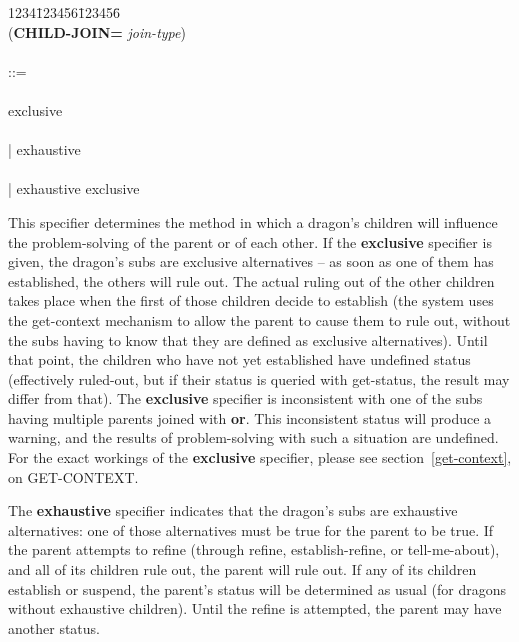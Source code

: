 \begin{tabbing}
1234\=123456\=123456\= \kill
\\
({\bf CHILD-JOIN=}  {\it join-type\/}) \\
\\
 ::= \\
\\
\>\>\>exclusive \\
\\
\>\>\>| exhaustive\\
\\
\>\>\>| exhaustive exclusive\\
\end{tabbing}
This specifier determines the method in which a dragon's children will
influence the problem-solving of the parent or of each other. If the
{\bf exclusive} specifier is given, the dragon's subs are exclusive
alternatives -- as soon as one of them has established, the others
will rule out. The actual ruling out of the other children takes place
when the first of those children decide to establish (the system uses
the get-context mechanism to allow the parent to cause them to rule
out, without the subs having to know that they are defined as
exclusive alternatives). Until that point, the children who have not
yet established have undefined status (effectively ruled-out, but if
their status is queried with get-status, the result may differ from
that).  The {\bf exclusive} specifier is inconsistent with one of the
subs having multiple parents joined with {\bf or}. This inconsistent
status will produce a warning, and the results of problem-solving with
such a situation are undefined. For the exact workings of the {\bf
exclusive} specifier, please see section~\ref{get-context}, on GET-CONTEXT.

The {\bf exhaustive} specifier indicates that the dragon's subs are
exhaustive alternatives: one of those alternatives must be true for
the parent to be true.  If the parent attempts to refine (through
refine, establish-refine, or tell-me-about), and all of its children
rule out, the parent will rule out. If any of its children establish
or suspend, the parent's status will be determined as usual (for
dragons without exhaustive children). Until the refine is attempted,
the parent may have another status.

